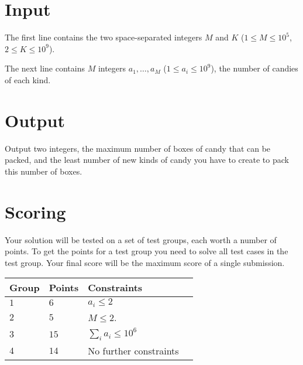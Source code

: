\section*{Input}
The first line contains the two space-separated integers $M$ and $K$ ($1 \le M \le 10^5$, $2 \le K \le 10^9$).

The next line contains $M$ integers $a_1, \dots, a_M$ ($1 \le a_i \le 10^9$), the number of candies of each kind.

\section*{Output}
Output two integers, the maximum number of boxes of candy that can be packed, and the least number of new kinds of candy you have to create to pack this number of boxes.

\section*{Scoring}
Your solution will be tested on a set of test groups, each worth a number of points.
To get the points for a test group you need to solve all test cases in the test group.
Your final score will be the maximum score of a single submission.

\noindent
\begin{tabular}{| l | l | l | l |}
\hline
Group & Points & Constraints \\ \hline
$1$   & $6$    & $a_i \le 2$ \\ \hline
$2$   & $5$    & $M \le 2$. \\ \hline
$3$   & $15$   & $\sum_i{a_i} \le 10^6$\\ \hline
$4$   & $14$   & No further constraints\\ \hline
\end{tabular}

